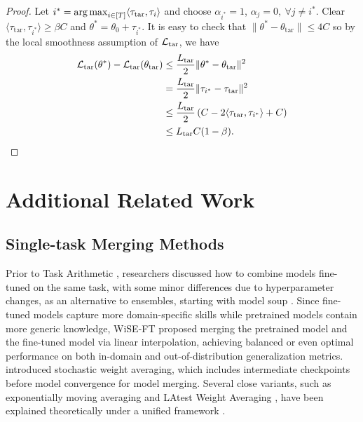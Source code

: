 \generalize*
\begin{proof}
Let $i^* = \operatorname*{arg\,max}_{i\in[T]}\langle \tau_\mathrm{tar}, \tau_i\rangle$ and choose $\alpha_{i^*} = 1$, $\alpha_j = 0,~\forall j\neq i^*$. Clear $\langle \tau_\mathrm{tar}, \tau_{i^*}\rangle \geq \beta C$ and $\theta^* = \theta_0 + \tau_{i^*}$. It is easy to check that $\|\theta^* - \theta_\mathrm{tar}\| \leq 4C$ so by the local smoothness assumption of ${\mathcal{L}}_\mathrm{tar}$, we have
\begin{align*}
    {\mathcal{L}}_\mathrm{tar}(\theta^*) - {\mathcal{L}}_\mathrm{tar}(\theta_\mathrm{tar}) &\leq \frac{L_\mathrm{tar}}{2}\|\theta^* - \theta_\mathrm{tar}\|^2 \\
    &= \frac{L_\mathrm{tar}}{2}\|\tau_{i^*} - \tau_\mathrm{tar}\|^2 \\
    &\leq \frac{L_\mathrm{tar}}{2}\left( C - 2\langle \tau_\mathrm{tar}, \tau_{i^*}\rangle + C\right) \\
    &\leq L_\mathrm{tar}C(1- \beta).\qedhere
\end{align*}
\end{proof}

\section{Additional Related Work}
\label{sec:ta-methods}

\subsection{Single-task Merging Methods}
\label{sec:single-task}
Prior to Task Arithmetic \citep{ilharco2022editing}, researchers discussed how to combine models fine-tuned on the same task, with some minor differences due to hyperparameter changes, as an alternative to ensembles, starting with model soup \citep{pmlr-v162-wortsman22a}. Since fine-tuned models capture more domain-specific skills while pretrained models contain more generic knowledge, WiSE-FT \citep{wortsman2021robust} proposed merging the pretrained model and the fine-tuned model via linear interpolation, achieving balanced or even optimal performance on both in-domain and out-of-distribution generalization metrics. \citet{izmailov2018averaging} introduced stochastic weight averaging, which includes intermediate checkpoints before model convergence for model merging. Several close variants, such as exponentially moving averaging \citep{szegedy2016rethinking} and LAtest Weight Averaging \citep{kaddour2022stop, sanyal2023early}, have been explained theoretically under a unified framework \citep{wang2024unified}.

